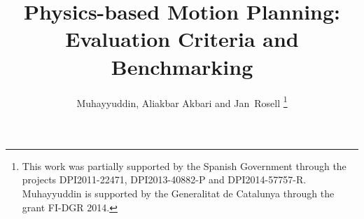 \documentclass[runningheads,a4paper]{llncs}
\begin{document}
\mainmatter  %

\title{Physics-based Motion Planning: Evaluation Criteria and Benchmarking}


%
%
\author{Muhayyuddin, Aliakbar Akbari and Jan~Rosell%
\thanks{This work was partially supported by the Spanish Government through the projects \mbox{DPI2011-22471}, \mbox{DPI2013-40882-P} and \mbox{DPI2014-57757-R}.
Muhayyuddin is supported by the Generalitat de Catalunya through the grant FI-DGR 2014.}
}
%


%
%

\maketitle
\end{document}
